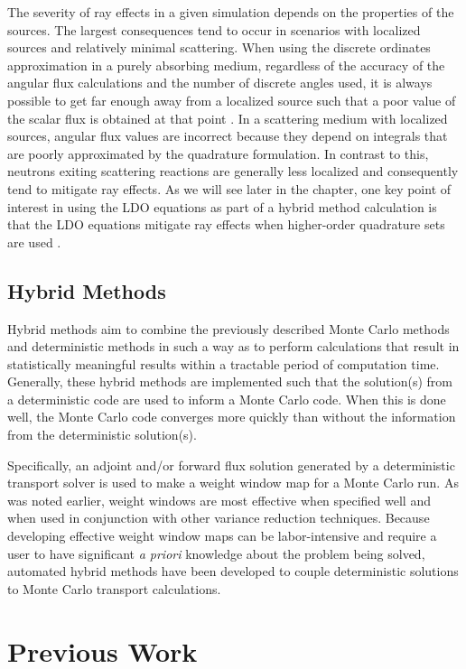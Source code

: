 The severity of ray effects in a given simulation depends on the properties of
the  sources. The largest consequences tend to occur in scenarios with localized
sources and relatively minimal scattering. When using the discrete ordinates
approximation in a purely absorbing medium, regardless of the accuracy of the
angular flux calculations and the number of discrete angles used, it is always
possible to get far enough away from a localized source such that a poor value
of the scalar flux is obtained at that point \cite{lathrop}. In a scattering
medium with localized sources, angular flux values are incorrect because they
depend  on integrals that are poorly approximated by the quadrature formulation.
In contrast  to this, neutrons exiting scattering reactions are generally less
localized and  consequently tend to  mitigate ray effects. As we will see later
in the chapter, one key point of interest in using the LDO equations as part of
a hybrid method calculation is that the LDO equations mitigate ray effects when
higher-order quadrature sets are used  \cite{ahrens}.

\subsection{Hybrid Methods}

Hybrid methods aim to combine the previously described Monte Carlo
methods and deterministic methods in such a way as to perform calculations that result
in statistically meaningful results within a tractable period of computation time.
Generally, these hybrid methods are implemented such that the solution(s) from a 
deterministic code are used to inform a Monte Carlo code. When this is done well, the
Monte Carlo code converges more quickly than without the information from the
deterministic solution(s).

Specifically, an adjoint and/or forward flux solution generated by a deterministic 
transport solver is used to make a weight window map for a Monte Carlo run. As was
noted earlier, weight windows are most effective when specified well and when used in
conjunction with other variance reduction techniques. Because developing effective
weight window maps can be labor-intensive and require a user to have significant 
\textit{a priori} knowledge about the problem being solved, automated hybrid methods
have been developed to couple deterministic solutions to Monte Carlo transport
calculations.

\section{Previous Work}

